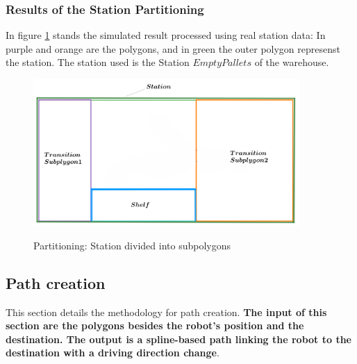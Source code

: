 \subsubsection{Results of the Station Partitioning}

In figure \ref{Station polygon} stands the simulated result processed using real station data: In purple and orange are 
the polygons, and in green the outer polygon represenst the station.
The station used is the Station \(Empty Pallets\) of the warehouse.

\begin{figure}[H]
    \begin{center}
        \includegraphics[width=4in]{images/Chap2/subpolygons.png}\\
        \caption{Partitioning: Station divided into subpolygons}
        \label{Station polygon}
        \end{center}    
\end{figure}


\subsection{Path creation}
This section details the methodology for path creation. \textbf{The input of this section are the polygons besides
the robot's position and the destination. The output is a spline-based path linking the robot to the destination with a 
driving direction change}.

